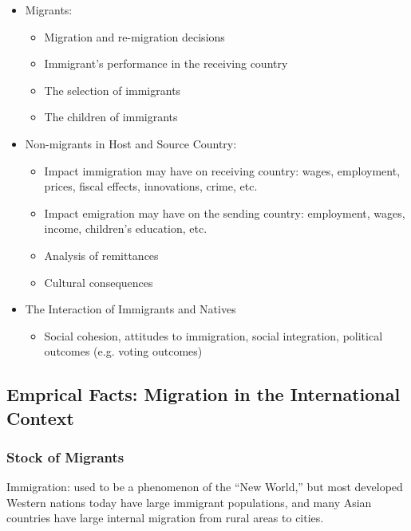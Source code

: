         \begin{itemize}
            \item Migrants:
                \begin{itemize}
                    \item Migration and re-migration decisions
                    \item Immigrant's performance in the receiving country
                    \item The selection of immigrants
                    \item The children of immigrants
                \end{itemize}
            \item Non-migrants in Host and Source Country:
                \begin{itemize}
                    \item Impact immigration may have on receiving country: wages, employment, prices, fiscal effects, innovations, crime, etc.
                    \item Impact emigration may have on the sending country: employment, wages, income, children's education, etc.
                    \item Analysis of remittances
                    \item Cultural consequences
                \end{itemize}
            \item The Interaction of Immigrants and Natives
                \begin{itemize}
                    \item Social cohesion, attitudes to immigration, social integration, political outcomes (e.g. voting outcomes)
                \end{itemize}
        \end{itemize}

    \subsection{Emprical Facts: Migration in the International Context}

        \subsubsection{Stock of Migrants}

            Immigration: used to be a phenomenon of the “New World,” but most developed Western nations today have large immigrant populations, and many Asian countries have large internal migration from rural areas to cities.

